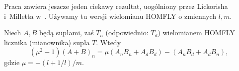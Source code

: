 Praca \cite{conway70} zawiera jeszcze jeden ciekawy rezultat, uogólniony przez Lickorisha i~Milletta w~\cite[fakt 12]{lickorish87}.
Używamy tu wersji wielomianu HOMFLY o zmiennych $l, m$.

\begin{proposition}
    Niech $A, B$ będą supłami, zaś $T_n$ (odpowiednio: $T_d$)  wielomianem HOMFLY licznika (mianownika) supła $T$.
    Wtedy
    \begin{equation}
        (\mu^2 - 1)(A+B)_n = \mu(A_nB_n + A_dB_d) - (A_nB_d + A_dB_n),
    \end{equation}
    gdzie $\mu = -(l + 1/l)/m$. %
\end{proposition}





